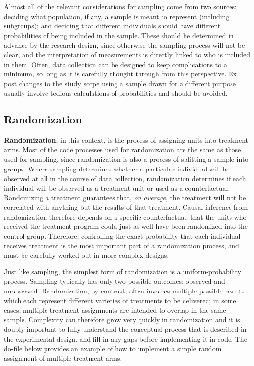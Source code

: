 
Almost all of the relevant considerations for sampling come from two sources:
deciding what population, if any, a sample is meant to represent (including subgroups);
and deciding that different individuals should have different probabilities
of being included in the sample.
These should be determined in advance by the research design,
since otherwise the sampling process will not be clear,
and the interpretation of measurements is directly linked to who is included in them.
Often, data collection can be designed to keep complications to a minimum,
so long as it is carefully thought through from this perspective.
Ex post changes to the study scope using a sample drawn for a different purpose
usually involve tedious calculations of probabilities and should be avoided.


\subsection{Randomization}

\textbf{Randomization}, in this context, is the process of assigning units into treatment arms.
Most of the code processes used for randomization are the same as those used for sampling,
since randomization is also a process of splitting a sample into groups.
Where sampling determines whether a particular individual
will be observed at all in the course of data collection,
randomization determines if each individual will be observed
as a treatment unit or used as a counterfactual.
Randomizing a treatment guarantees that, \textit{on average},
the treatment will not be correlated with anything but the results of that treatment.\cite{duflo2007using}
Causal inference from randomization therefore depends on a specific counterfactual:
that the units who received the treatment program
could just as well have been randomized into the control group.
Therefore, controlling the exact probability that each individual receives treatment
is the most important part of a randomization process,
and must be carefully worked out in more complex designs.

Just like sampling, the simplest form of randomization is a uniform-probability process.
Sampling typically has only two possible outcomes: observed and unobserved.
Randomization, by contrast, often involves multiple possible results
which each represent different varieties of treatments to be delivered;
in some cases, multiple treatment assignments are intended to overlap in the same sample.
Complexity can therefore grow very quickly in randomization
and it is doubly important to fully understand the conceptual process
that is described in the experimental design,
and fill in any gaps before implementing it in code.
The do-file below provides an example of how to implement a simple random assignment of multiple treatment arms. 


